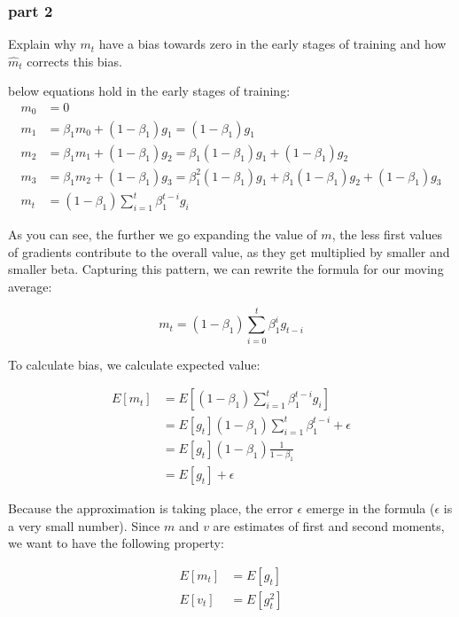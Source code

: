 \subsubsection{part 2}
Explain why \(m_t\) have a bias towards zero in the early stages of training and how \(\hat{m}_t\) corrects this bias.
\begin{qsolve}
    \begin{qsolve}[]
        below equations hold in the early stages of training:
        \splitqsolve[\splitqsolve]
        \[
        \begin{aligned}
        m_0 &= 0 \\
        m_1 &= \beta_1 m_0 + (1 - \beta_1) g_1 = (1 - \beta_1) g_1 \\
        m_2 &= \beta_1 m_1 + (1 - \beta_1) g_2 = \beta_1 (1 - \beta_1) g_1 + (1 - \beta_1) g_2 \\
        m_3 &= \beta_1 m_2 + (1 - \beta_1) g_3 = \beta_1^2 (1 - \beta_1) g_1 + \beta_1 (1 - \beta_1) g_2 + (1 - \beta_1) g_3 \\
        m_t &= (1 - \beta_1) \sum_{i=1}^t \beta_1^{t-i} g_i
        \end{aligned}
        \]

        As you can see, the further we go expanding the value of \( m \), the less first values of gradients contribute to the overall value, as they get multiplied by smaller and smaller beta. Capturing this pattern, we can rewrite the formula for our moving average:

        \[
        m_t = (1 - \beta_1) \sum_{i=0}^t \beta_1^i g_{t-i}
        \]

        To calculate bias, we calculate expected value:

        \[
        \begin{aligned}
        E[m_t] &= E[(1 - \beta_1) \sum_{i=1}^t \beta_1^{t-i} g_i] \\
        &= E[g_t] (1 - \beta_1) \sum_{i=1}^t \beta_1^{t-i} + \epsilon \\
        &= E[g_t] (1 - \beta_1) \frac{1}{1 - \beta_1} \\
        &= E[g_t] + \epsilon
        \end{aligned}
        \]

        Because the approximation is taking place, the error \( \epsilon \) emerge in the formula (\( \epsilon \) is a very small number). Since \( m \) and \( v \) are estimates of first and second moments, we want to have the following property:

        \[
        \begin{aligned}
        E[m_t] &= E[g_t] \\
        E[v_t] &= E[g_t^2]
        \end{aligned}
        \]


\end{qsolve}
\end{qsolve}
